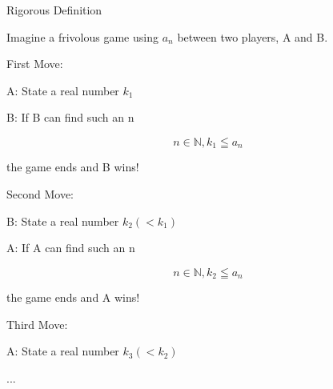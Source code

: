 %
%


\begin{frame}[c]{}{}
  {\large Rigorous Definition}
\end{frame}

\begin{frame}[c]{}{}
  Imagine a frivolous game using $a_n$ between two players, A and B.
\end{frame}

\begin{frame}[c]{}{}
  First Move:

  \vspace{4ex}

  A: State a real number $k_1$

  \vspace{2ex}

  B: If B can find such an n

  $$n \in \mathbb{N}, k_1 \leqq a_n$$

  the game ends and B wins!
\end{frame}

\begin{frame}[c]{}{}
  Second Move:

  \vspace{4ex}

  B: State a real number $k_2 (< k_1)$

  \vspace{2ex}

  A: If A can find such an n

  $$n \in \mathbb{N}, k_2 \leqq a_n$$

  the game ends and A wins!
\end{frame}

\begin{frame}[c]{}{}
  Third Move:

  \vspace{4ex}

  A: State a real number $k_3 (< k_2)$

  ...
\end{frame}

